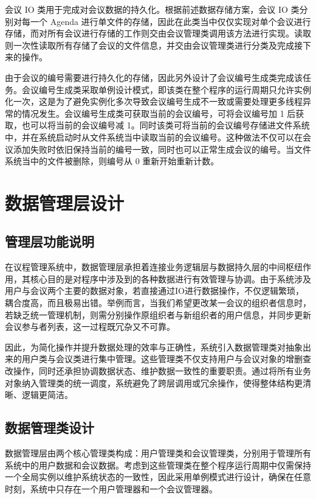 \documentclass[a4paper, twoside, utf8]{ctexart}
\begin{document}
    会议 IO 类用于完成对会议数据的持久化。根据前述数据存储方案，会议 IO 类分别对每一个 Agenda 进行单文件的存储，因此在此类当中仅仅实现对单个会议进行存储，而对所有会议进行存储的工作则交由会议管理类调用该方法进行实现。读取则一次性读取所有存储了会议的文件信息，并交由会议管理类进行分类及完成接下来的操作。
    
    由于会议的编号需要进行持久化的存储，因此另外设计了会议编号生成类完成该任务。会议编号生成类采取单例设计模式，即该类在整个程序的运行周期只允许实例化一次，这是为了避免实例化多次导致会议编号生成不一致或需要处理更多线程异常的情况发生。会议编号生成类可获取当前的会议编号，可将会议编号加 1 后获取，也可以将当前的会议编号减 1。同时该类可将当前的会议编号存储进文件系统中，并在系统启动时从文件系统当中读取当前的会议编号。这种做法不仅可以在会议添加失败时依旧保持当前的编号一致，同时也可以正常生成会议的编号。当文件系统当中的文件被删除，则编号从 0 重新开始重新计数。
    
    \section{数据管理层设计}

    \subsection{管理层功能说明}

    在议程管理系统中，数据管理层承担着连接业务逻辑层与数据持久层的中间枢纽作用，其核心目的是对程序中涉及到的各种数据进行有效管理与协调。由于系统涉及用户与会议两个主要的数据对象，若直接通过IO进行数据操作，不仅逻辑繁琐，耦合度高，而且极易出错。举例而言，当我们希望更改某一会议的组织者信息时，若缺乏统一管理机制，则需分别操作原组织者与新组织者的用户信息，并同步更新会议参与者列表，这一过程既冗杂又不可靠。

    因此，为简化操作并提升数据处理的效率与正确性，系统引入数据管理类对抽象出来的用户类与会议类进行集中管理。这些管理类不仅支持用户与会议对象的增删查改操作，同时还承担协调数据状态、维护数据一致性的重要职责。通过将所有业务对象纳入管理类的统一调度，系统避免了跨层调用或冗余操作，使得整体结构更清晰、逻辑更简洁。

    \subsection{数据管理类设计}

    数据管理层由两个核心管理类构成：用户管理类和会议管理类，分别用于管理所有系统中的用户数据和会议数据。考虑到这些管理类在整个程序运行周期中仅需保持一个全局实例以维护系统状态的一致性，因此采用单例模式进行设计，确保在任意时刻，系统中只存在一个用户管理器和一个会议管理器。
\end{document}
